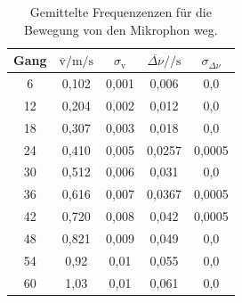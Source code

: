 \begin{table}
  \centering
  \caption{Gemittelte Frequenzenzen für die Bewegung von den Mikrophon weg.}
  \label{tab:schwebung}
  \begin{tabular}{c c c c c}
    \toprule
Gang &  $\overline{\text{v}}/\si{\meter\per\second}$ & $\sigma_{\text{v}}$
 & $\overline{\Delta\nu}/\si{\per\second}$ & $\sigma_{\Delta\nu}$\\
    \midrule
    6  & 0,102 & 0,001 & 0,006  &0,0\\
    12 & 0,204 & 0,002 & 0,012  &0,0\\
    18 & 0,307 & 0,003 & 0,018  &0,0\\
    24 & 0,410 & 0,005 & 0,0257 &0,0005\\
    30 & 0,512 & 0,006 & 0,031  &0,0\\
    36 & 0,616 & 0,007 & 0,0367 &0,0005\\
    42 & 0,720 & 0,008 & 0,042  &0,0005\\
    48 & 0,821 & 0,009 & 0,049  &0,0\\
    54 & 0,92  & 0,01  & 0,055  &0,0\\
    60 & 1,03  & 0,01  & 0,061  &0,0\\
    \bottomrule
  \end{tabular}
\end{table}
